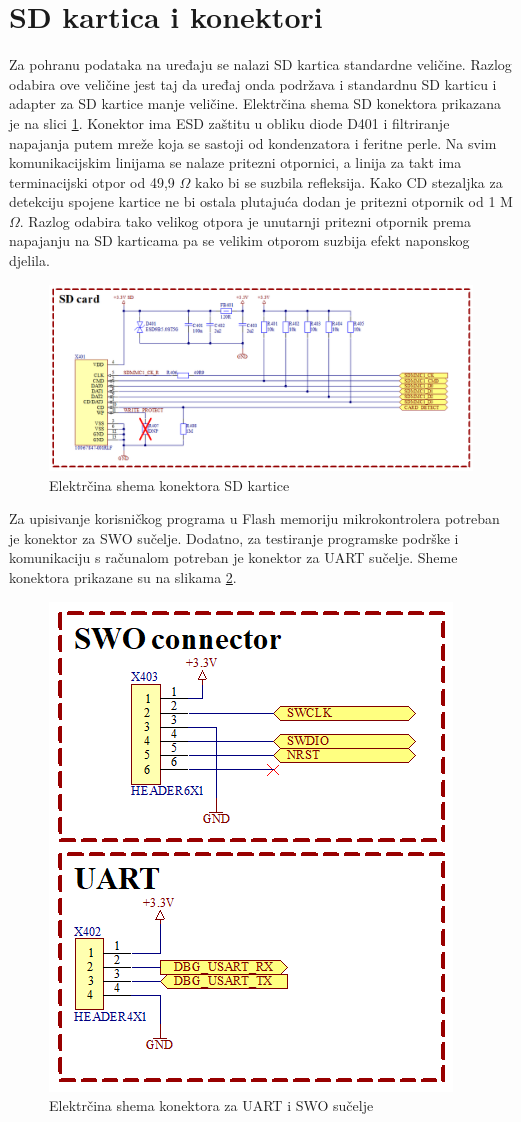 \section{SD kartica i konektori}
Za pohranu podataka na uređaju se nalazi SD kartica standardne veličine. Razlog odabira ove veličine jest taj da uređaj onda podržava i standardnu SD karticu i adapter za SD kartice manje veličine. Elektrčina shema SD konektora prikazana je na slici \ref{slk:SD}. Konektor ima ESD zaštitu u obliku diode D401 i filtriranje napajanja putem mreže koja se sastoji od kondenzatora i feritne perle. Na svim komunikacijskim linijama se nalaze pritezni otpornici, a linija za takt ima terminacijski otpor od 49,9 $\Omega$ kako bi se suzbila refleksija. Kako CD stezaljka za detekciju spojene kartice ne bi ostala plutajuća dodan je pritezni otpornik od 1 M$\Omega$. Razlog odabira tako velikog otpora je unutarnji pritezni otpornik prema napajanju na SD karticama pa se velikim otporom suzbija efekt naponskog djelila.
\begin{figure}[h!bt]
    \centering
    \includegraphics[width=\textwidth]{Figures/SD.png}
    \caption{Elektrčina shema konektora SD kartice}
    \label{slk:SD}
\end{figure}

Za upisivanje korisničkog programa u Flash memoriju mikrokontrolera potreban je konektor za SWO sučelje. Dodatno, za testiranje programske podrške i komunikaciju s računalom potreban je konektor za UART sučelje. Sheme konektora prikazane su na slikama \ref{slk:UART_SWO}.
\begin{figure}[!hbt]
    \centering
    \includegraphics[width=6 cm]{Figures/SWO_UART.png}
    \caption{Elektrčina shema konektora za UART i SWO sučelje}
    \label{slk:UART_SWO}
\end{figure}

